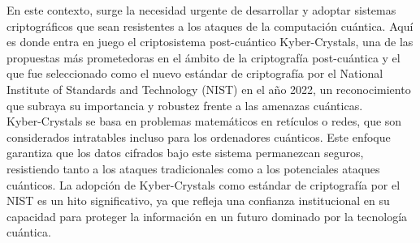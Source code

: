 En este contexto, surge la necesidad urgente de desarrollar y adoptar sistemas criptográficos que sean resistentes a los ataques de la computación cuántica. Aquí es donde entra en juego el criptosistema post-cuántico Kyber-Crystals, una de las propuestas más prometedoras en el ámbito de la criptografía post-cuántica y el que fue seleccionado como el nuevo estándar de criptografía por el National Institute of Standards and Technology (NIST) en el año 2022, un reconocimiento que subraya su importancia y robustez frente a las amenazas cuánticas.\\

Kyber-Crystals se basa en problemas matemáticos en retículos o redes, que son considerados intratables incluso para los ordenadores cuánticos. Este enfoque garantiza que los datos cifrados bajo este sistema permanezcan seguros, resistiendo tanto a los ataques tradicionales como a los potenciales ataques cuánticos. La adopción de Kyber-Crystals como estándar de criptografía por el NIST es un hito significativo, ya que refleja una confianza institucional en su capacidad para proteger la información en un futuro dominado por la tecnología cuántica.


\endinput
